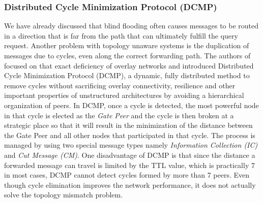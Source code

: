 \subsubsection{Distributed Cycle Minimization Protocol (DCMP)}
We have already discussed that blind flooding often causes messages to be routed in a direction
that is far from the path that can
ultimately fulfill the query request. Another problem with topology unaware
systems is the duplication of messages due to cycles, even along the correct
forwarding path. The authors of \cite{ZKB2008} focused on that exact deficiency
of overlay networks and introduced Distributed Cycle Minimization Protocol
(DCMP), a dynamic, fully distributed method to remove cycles without sacrificing
overlay connectivity, resilience and other important properties of unstructured
architectures by avoiding a hierarchical organization of peers. In DCMP, once a
cycle is detected, the most powerful node in that cycle is elected as the
\emph{Gate Peer} and the cycle is then broken at a strategic place so that it
will result in the minimization of the distance between the Gate Peer and all
other nodes that participated in that cycle. The process is managed by using two
special message types namely \emph{Information Collection (IC)} and \emph{Cut
Message (CM)}. One disadvantage of DCMP is that since the distance a forwarded
message can travel is limited by the TTL value, which is practically $7$ in most
cases, DCMP cannot detect cycles formed by more than 7 peers. Even though cycle
elimination improves the network performance, it does not actually solve the
topology mismatch problem.

